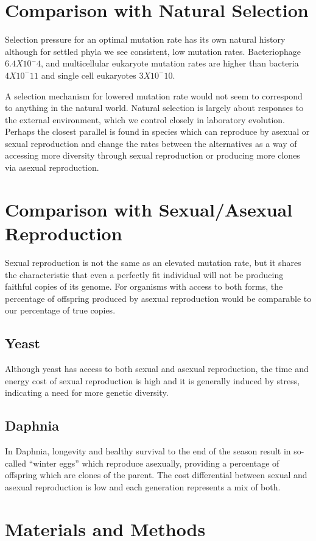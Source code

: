 \documentclass[10pt,letterpaper]{article}
\begin{document}
\section{Comparison with Natural Selection}
Selection pressure for an optimal mutation rate has its own natural history\cite{evomut} although for settled phyla we see consistent\cite{drake91}, low mutation rates.  Bacteriophage $6.4 X 10^-4$, and multicellular eukaryote mutation rates are higher than bacteria $4 X 10^-11$ and single cell eukaryotes $3 X 10^-10$.

A selection mechanism for lowered mutation rate would not seem to correspond to anything in the natural world.  Natural selection is largely about responses to the external environment, which we control closely in laboratory evolution.  Perhaps the closest parallel is found in species which can reproduce by asexual or sexual reproduction and change the rates between the alternatives as a way of accessing more diversity through sexual reproduction or producing more clones via asexual reproduction.


\section*{Comparison with Sexual/Asexual Reproduction}
Sexual reproduction is not the same as an elevated mutation rate, but it shares the characteristic that even a perfectly fit individual will not be producing faithful copies of its genome. For organisms with access to both forms, the percentage of offspring produced by asexual reproduction would be comparable to our percentage of true copies.
\subsection*{Yeast}
Although yeast has access to both sexual and asexual reproduction, the time and energy cost of sexual reproduction is high and it is generally induced by stress, indicating a need for more genetic diversity.
\subsection*{Daphnia} 
In Daphnia, longevity and healthy survival to the end of the season result in so-called ``winter eggs'' which reproduce asexually, providing a percentage of offspring which are clones of the parent. The cost differential between sexual and asexual reproduction is low and each generation represents a mix of both.

\section*{Materials and Methods}
\end{document}
